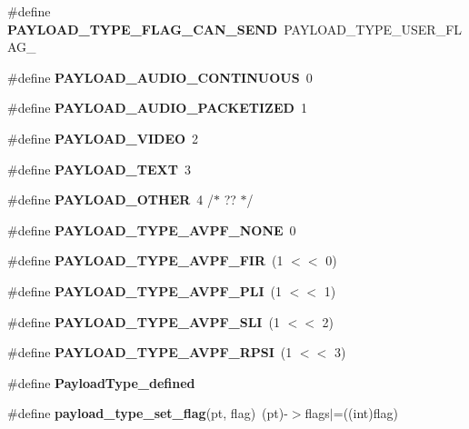 \begin{DoxyCompactItemize}
\#define {\bfseries P\+A\+Y\+L\+O\+A\+D\+\_\+\+T\+Y\+P\+E\+\_\+\+F\+L\+A\+G\+\_\+\+C\+A\+N\+\_\+\+S\+E\+ND}~P\+A\+Y\+L\+O\+A\+D\+\_\+\+T\+Y\+P\+E\+\_\+\+U\+S\+E\+R\+\_\+\+F\+L\+A\+G\+\_
\item 
\mbox{\label{payloadtype_8h_a4c4ae97bf5ac47aca3c88e98966559fc}} 
\#define {\bfseries P\+A\+Y\+L\+O\+A\+D\+\_\+\+A\+U\+D\+I\+O\+\_\+\+C\+O\+N\+T\+I\+N\+U\+O\+US}~0
\item 
\mbox{\label{payloadtype_8h_a5aa57d2d7430370aeacb7b43a4614fc6}} 
\#define {\bfseries P\+A\+Y\+L\+O\+A\+D\+\_\+\+A\+U\+D\+I\+O\+\_\+\+P\+A\+C\+K\+E\+T\+I\+Z\+ED}~1
\item 
\mbox{\label{payloadtype_8h_a9cef82cd973869858421a5c3aa229c6e}} 
\#define {\bfseries P\+A\+Y\+L\+O\+A\+D\+\_\+\+V\+I\+D\+EO}~2
\item 
\mbox{\label{payloadtype_8h_a17dea43c55cdf701c65bf5f878c0534b}} 
\#define {\bfseries P\+A\+Y\+L\+O\+A\+D\+\_\+\+T\+E\+XT}~3
\item 
\mbox{\label{payloadtype_8h_a2193cf1655ee460ec7b2ded3d2177660}} 
\#define {\bfseries P\+A\+Y\+L\+O\+A\+D\+\_\+\+O\+T\+H\+ER}~4  /$\ast$ ?? $\ast$/
\item 
\mbox{\label{payloadtype_8h_abedb607e226dd401941c7002b79ca6fe}} 
\#define {\bfseries P\+A\+Y\+L\+O\+A\+D\+\_\+\+T\+Y\+P\+E\+\_\+\+A\+V\+P\+F\+\_\+\+N\+O\+NE}~0
\item 
\mbox{\label{payloadtype_8h_ad6c5a7a120bb8988917021319b4ea014}} 
\#define {\bfseries P\+A\+Y\+L\+O\+A\+D\+\_\+\+T\+Y\+P\+E\+\_\+\+A\+V\+P\+F\+\_\+\+F\+IR}~(1 $<$$<$ 0)
\item 
\mbox{\label{payloadtype_8h_a9135cf78de40f30b41099fc8738944d2}} 
\#define {\bfseries P\+A\+Y\+L\+O\+A\+D\+\_\+\+T\+Y\+P\+E\+\_\+\+A\+V\+P\+F\+\_\+\+P\+LI}~(1 $<$$<$ 1)
\item 
\mbox{\label{payloadtype_8h_a912eaf3e4ed0451803111997f18b0a02}} 
\#define {\bfseries P\+A\+Y\+L\+O\+A\+D\+\_\+\+T\+Y\+P\+E\+\_\+\+A\+V\+P\+F\+\_\+\+S\+LI}~(1 $<$$<$ 2)
\item 
\mbox{\label{payloadtype_8h_adc9e98bffbacdc8011316983a199dddb}} 
\#define {\bfseries P\+A\+Y\+L\+O\+A\+D\+\_\+\+T\+Y\+P\+E\+\_\+\+A\+V\+P\+F\+\_\+\+R\+P\+SI}~(1 $<$$<$ 3)
\item 
\mbox{\label{payloadtype_8h_ab62540f6c164df9f6d1ac59468214b50}} 
\#define {\bfseries Payload\+Type\+\_\+defined}
\item 
\mbox{\label{payloadtype_8h_abec15372b3b4ff93434111434deb16fe}} 
\#define {\bfseries payload\+\_\+type\+\_\+set\+\_\+flag}(pt,  flag)~(pt)-\/$>$flags$\vert$=((int)flag)
\item 

\end{DoxyCompactItemize}
